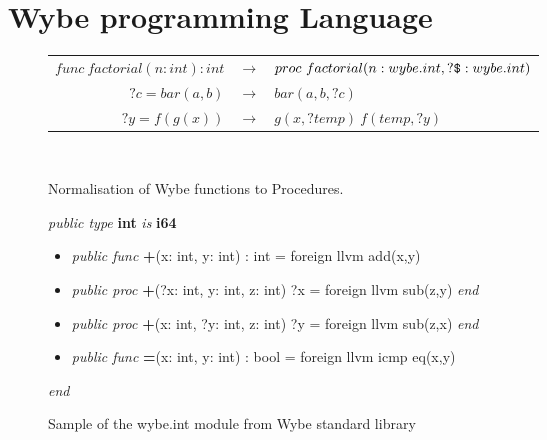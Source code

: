 \chapter{Wybe programming Language}


\begin{figure}
\centering
\begin{tabular}{r c l}

\( func\ factorial(n:int):int \) & \(\rightarrow \) & 
\( proc\ factorial(n:wybe.int, ?\verb+$+:wybe.int) \) \\
\( ?c = bar(a, b) \) & \(\rightarrow\) & \( bar(a, b, ?c) \) \\
\( ?y = f(g(x)) \) & \(\rightarrow\) & \( g(x, ?temp)\ f(temp, ?y) \) \\


\end{tabular}
\\
\caption{Normalisation of Wybe functions to Procedures.}
\label{fig:wybe_convert_to_proc}
\end{figure}

\begin{figure}

\textit{public type} \textbf{int} \textit{is} \textbf{i64}

\begin{itemize}[label={}]
\setlength\itemsep{0em}
\item
\textit{public func} 
\textbf{+}(x: int, y: int) : int = foreign llvm add(x,y)

\item  
\textit{public proc} 
\textbf{+}(?x: int, y: int, z: int) ?x = foreign llvm sub(z,y) 
\textit{end}

\item 
\textit{public proc} 
\textbf{+}(x: int, ?y: int, z: int) ?y = foreign llvm sub(z,x) 
\textit{end}

\item 
\textit{public func} 
\textbf{=}(x: int, y: int) : bool = foreign llvm icmp eq(x,y)
\end{itemize}

\textit{end} \\

\caption{Sample of the wybe.int module from Wybe standard library}
\label{fig:wybe_int}
\end{figure}



